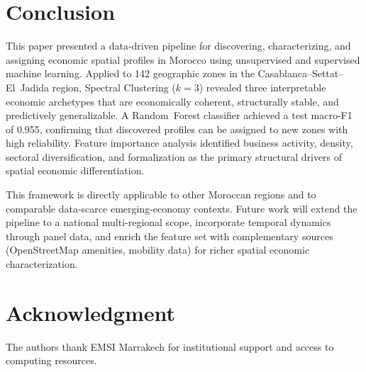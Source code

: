 \documentclass[conference]{IEEEtran}
\begin{document}
\section{Conclusion}
\label{sec:conclusion}

This paper presented a data-driven pipeline for discovering,
characterizing, and assigning economic spatial profiles in Morocco
using unsupervised and supervised machine learning.
Applied to 142 geographic zones in the Casablanca--Settat--El~Jadida
region, Spectral Clustering ($k=3$) revealed three interpretable
economic archetypes that are economically coherent, structurally stable,
and predictively generalizable. A Random~Forest classifier achieved
a test macro-F1 of 0.955, confirming that discovered profiles
can be assigned to new zones with high reliability.
Feature importance analysis identified business activity, density,
sectoral diversification, and formalization as the primary structural
drivers of spatial economic differentiation.

This framework is directly applicable to other Moroccan regions
and to comparable data-scarce emerging-economy contexts.
Future work will extend the pipeline to a national multi-regional
scope, incorporate temporal dynamics through panel data,
and enrich the feature set with complementary sources
(OpenStreetMap amenities, mobility data) for richer
spatial economic characterization.

\section*{Acknowledgment}

The authors thank EMSI Marrakech for institutional support
and access to computing resources.
\end{document}
